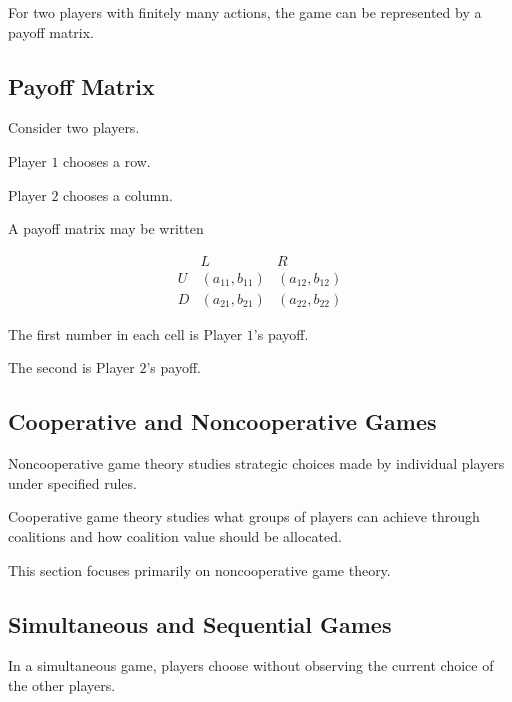 For two players with finitely many actions, the game can be represented by
a payoff matrix.

\subsection{Payoff Matrix}
\label{subsec:game-payoff-matrix}

Consider two players.

Player \(1\) chooses a row.

Player \(2\) chooses a column.

A payoff matrix may be written

\[
\begin{array}{c|cc}
&
L
&
R
\\
\hline
U
&
(a_{11},b_{11})
&
(a_{12},b_{12})
\\
D
&
(a_{21},b_{21})
&
(a_{22},b_{22})
\end{array}
\]

The first number in each cell is Player \(1\)'s payoff.

The second is Player \(2\)'s payoff.

\subsection{Cooperative and Noncooperative Games}
\label{subsec:cooperative-noncooperative-games}

Noncooperative game theory studies strategic choices made by individual
players under specified rules.

Cooperative game theory studies what groups of players can achieve through
coalitions and how coalition value should be allocated.

This section focuses primarily on noncooperative game theory.

\subsection{Simultaneous and Sequential Games}
\label{subsec:simultaneous-sequential-games}

In a simultaneous game, players choose without observing the current choice
of the other players.

